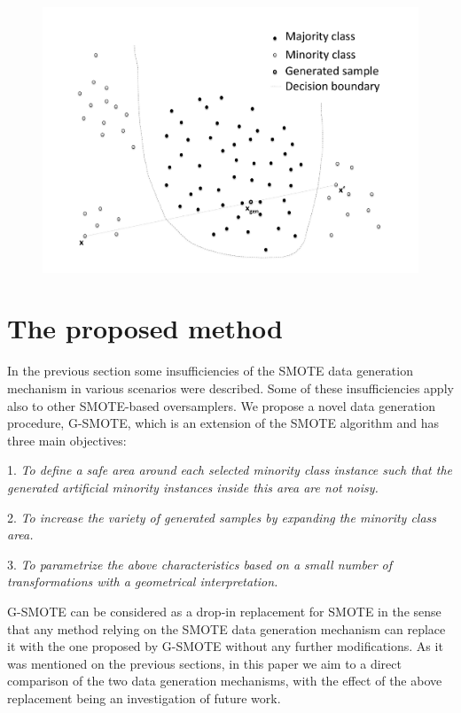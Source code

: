 \documentclass[parskip=full]{scrartcl}
\begin{document}
\begin{figure}[H]
	\centering
	\includegraphics[width=12cm, keepaspectratio]{./artifacts/fig4}
\end{figure}

\section{The proposed method}

In the previous section some insufficiencies of the SMOTE data generation
mechanism in various scenarios were described. Some of these insufficiencies
apply also to other SMOTE-based oversamplers. We propose a novel data generation
procedure, G-SMOTE, which is an extension of the SMOTE algorithm and has three
main objectives:

1. \textit{To define a safe area around each selected minority class instance
such that the generated artificial minority instances inside this area are not
noisy.}

2. \textit{To increase the variety of generated samples by expanding the
minority class area.}

3. \textit{To parametrize the above characteristics based on a small number of
transformations with a geometrical interpretation.}

G-SMOTE can be considered as a drop-in replacement for SMOTE in the sense that
any method relying on the SMOTE data generation mechanism can replace it with
the one proposed by G-SMOTE without any further modifications. As it was
mentioned on the previous sections, in this paper we aim to a direct comparison
of the two data generation mechanisms, with the effect of the above replacement
being an investigation of future work.
\end{document}
